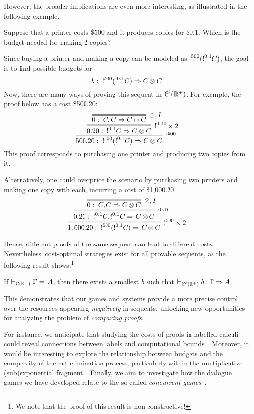 %
However, the broader implications are even more interesting, as illustrated in the following example.
\begin{example}
Suppose that a printer costs \$500 and it produces copies for \$0.1. Which is the budget needed for making 2 copies?

Since buying a printer and making a copy can be modeled as  $\hbox{$\mathop{!}^{500}$}(\hbox{$\mathop{!}^{0.1}$}C)$, the goal is to find possible budgets for 
$$
b:\;  \hbox{$\mathop{!}^{500}$}(\hbox{$\mathop{!}^{0.1}$}C)\Rightarrow C\otimes C
$$
Now, there are many ways of proving this sequent in $\mathcal{C}^\ell(\mathbb{R}^+)$. For example, the proof below has a cost \$500.20:
$$
\infer[\nbang{500}]{500.20:\;  \nbang{500}(\nbang{0.1}C)\seq C\otimes C}
{\infer=[\nbang{0.10} \times 2]{0.20:\;  \nbang{0.1}C\seq C\otimes C}
{\infer=[\otimes,I]{0:\;  C,C\seq C\otimes C}{}}} 
$$
This proof corresponds to purchasing one printer and producing two copies from it.

Alternatively, one could overprice the scenario by purchasing two printers and making one copy with each, incurring a cost of \$1,000.20.
$$
\infer=[\nbang{500}  \times 2]{1,000.20:\;  \nbang{500}(\nbang{0.1}C)\seq C\otimes C}
{\infer=[\nbang{0.10}]{0.20:\;  \nbang{0.1}C,\nbang{0.1}C\seq C\otimes C}
{\infer=[\otimes,I]{0:\;  C,C\seq C\otimes C}{}}} 
$$
\end{example}
Hence, different proofs of the same sequent can lead to different costs. Nevertheless, cost-optimal strategies exist for all provable sequents, as the following result shows.\footnote{We note that the proof of this result is non-constructive!}

\begin{theorem}\label{cor:spectrum}
If $\vdash_{\mathcal{C}(\mathbb{R}^+)}\Gamma\Rightarrow A$, then there exists a smallest $b$ such that $\vdash_{\mathcal{C}^\ell(\mathbb{R}^+)}b: \Gamma\Rightarrow A$.
\end{theorem}
This  demonstrates that our games and systems provide a more precise control over the resources appearing {\em negatively} in sequents, unlocking new opportunities for analyzing the problem of {\em comparing proofs}. 

For instance, we anticipate that studying the costs of proofs in labelled calculi could reveal connections between labels and computational bounds~\cite{DBLP:journals/jfp/AccattoliGK20}.
%
Moreover, it would be interesting to explore the relationship between budgets and the complexity of the cut-elimination process, particularly within the multiplicative-(sub)exponential fragment~\cite{DBLP:journals/tcs/Strassburger03,DBLP:journals/tocl/StrassburgerG11}.
%
Finally, we aim to investigate how the dialogue games we have developed relate to the so-called {\em concurrent games}~\cite{DBLP:conf/lics/AbramskyM99, DBLP:conf/lics/FaggianM05,DBLP:journals/lmcs/CastellanCRW17}. 



